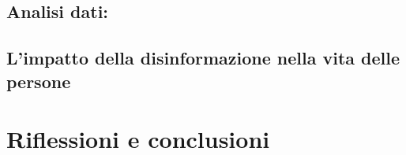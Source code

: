 \documentclass{article}
\begin{document}
\newpage\flushleft \subsection{Analisi dati:}

\flushleft \subsection{L'impatto della disinformazione nella vita delle persone}

\centering
\newpage\section{Riflessioni e conclusioni}

\newpage

\end{document}
